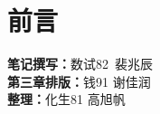 \chapter*{前言}

\begin{tcolorbox}[title={\bfseries 参与成员}]
	 \textbf{笔记撰写：}数试82\ 裴兆辰\\
	 \textbf{第三章排版：}钱91 谢佳润\\
	 \textbf{整理：}化生81 高旭帆\\
\end{tcolorbox}

\newpage